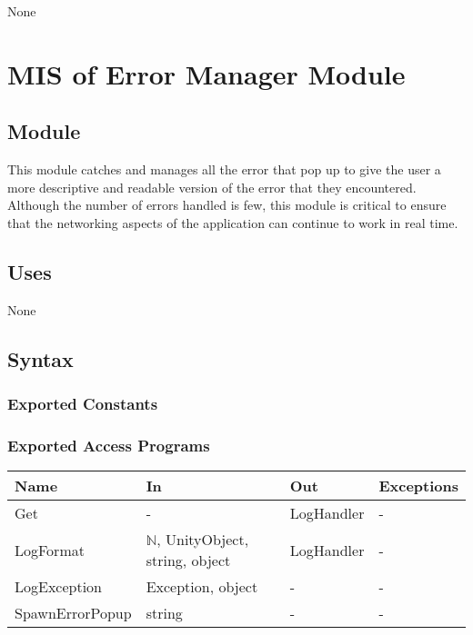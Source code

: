 \documentclass[12pt, titlepage]{article}
\begin{document}
None

\newpage


\section{MIS of {Error Manager Module}} \label{sec:ErrorModule} 

\subsection{Module}

This module catches and manages all the error that pop up to give the user a more descriptive and readable version of the error that they encountered. Although the number of errors handled is few, this module is critical to ensure that the networking aspects of the application can continue to work in real time. 

\subsection{Uses}

None

\subsection{Syntax}

\subsubsection{Exported Constants}

\subsubsection{Exported Access Programs}

\begin{center}
\begin{tabular}{p{3.2cm} p{4cm} p{4cm} p{2cm}}
\hline
\textbf{Name} & \textbf{In} & \textbf{Out} & \textbf{Exceptions} \\
\hline
Get & - & LogHandler & - \\
LogFormat & $\mathds{N}$, UnityObject, string, object & LogHandler & - \\
LogException & Exception, object & - &-\\
SpawnErrorPopup & string & - & - \\
\hline
\end{tabular}
\end{center}
\end{document}
